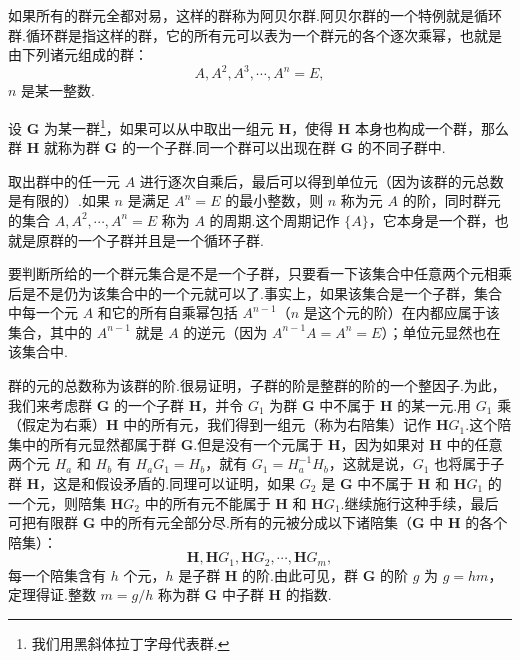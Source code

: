 如果所有的群元全都对易，这样的群称为阿贝尔群.阿贝尔群的一个特例就是循环群.循环群是指这样的群，它的所有元可以表为一个群元的各个逐次乘幂，也就是由下列诸元组成的群：
\begin{equation*}
  A,A^2,A^3,\cdots,A^n=E,
\end{equation*}
$n$ 是某一整数.

设 $\boldsymbol{G}$ 为某一群\footnote{我们用黑斜体拉丁字母代表群.}，如果可以从中取出一组元 $\boldsymbol{H}$，使得 $\boldsymbol{H}$ 本身也构成一个群，那么群 $\boldsymbol{H}$ 就称为群 $\boldsymbol{G}$ 的一个子群.同一个群可以出现在群 $\boldsymbol{G}$ 的不同子群中.

取出群中的任一元 $A$ 进行逐次自乘后，最后可以得到单位元（因为该群的元总数是有限的）.如果 $n$ 是满足 $A^n=E$ 的最小整数，则 $n$ 称为元 $A$ 的阶，同时群元的集合 $A,A^2,\cdots,A^n=E$ 称为 $A$ 的周期.这个周期记作 $\{A\}$，它本身是一个群，也就是原群的一个子群并且是一个循环子群.

要判断所给的一个群元集合是不是一个子群，只要看一下该集合中任意两个元相乘后是不是仍为该集合中的一个元就可以了.事实上，如果该集合是一个子群，集合中每一个元 $A$ 和它的所有自乘幂包括 $A^{n-1}$（$n$ 是这个元的阶）在内都应属于该集合，其中的 $A^{n-1}$ 就是 $A$ 的逆元（因为 $A^{n-1}A=A^n=E$）；单位元显然也在该集合中.

群的元的总数称为该群的阶.很易证明，子群的阶是整群的阶的一个整因子.为此，我们来考虑群 $\boldsymbol{G}$ 的一个子群 $\boldsymbol{H}$，并令 $G_1$ 为群 $\boldsymbol{G}$ 中不属于 $\boldsymbol{H}$ 的某一元.用 $G_1$ 乘（假定为右乘）$\boldsymbol{H}$ 中的所有元，我们得到一组元（称为右陪集）记作 $\boldsymbol{H}G_1$.这个陪集中的所有元显然都属于群 $\boldsymbol{G}$.但是没有一个元属于 $\boldsymbol{H}$，因为如果对 $\boldsymbol{H}$ 中的任意两个元 $H_a$ 和 $H_b$ 有 $H_aG_1=H_b$，就有 $G_1=H_a^{-1}H_b$，这就是说，$G_1$ 也将属于子群 $\boldsymbol{H}$，这是和假设矛盾的.同理可以证明，如果 $G_2$ 是 $\boldsymbol{G}$ 中不属于 $\boldsymbol{H}$ 和 $\boldsymbol{H}G_1$ 的一个元，则陪集 $\boldsymbol{H}G_2$ 中的所有元不能属于 $\boldsymbol{H}$ 和 $\boldsymbol{H}G_1$.继续施行这种手续，最后可把有限群 $\boldsymbol{G}$ 中的所有元全部分尽.所有的元被分成以下诸陪集（$\boldsymbol{G}$ 中 $\boldsymbol{H}$ 的各个陪集）：
\begin{equation*}
  \boldsymbol{H},\boldsymbol{H}G_1,\boldsymbol{H}G_2,\cdots,\boldsymbol{H}G_m,
\end{equation*}
每一个陪集含有 $h$ 个元，$h$ 是子群 $\boldsymbol{H}$ 的阶.由此可见，群 $\boldsymbol{G}$ 的阶 $g$ 为 $g=hm$，定理得证.整数 $m=g/h$ 称为群 $\boldsymbol{G}$ 中子群 $\boldsymbol{H}$ 的指数.


